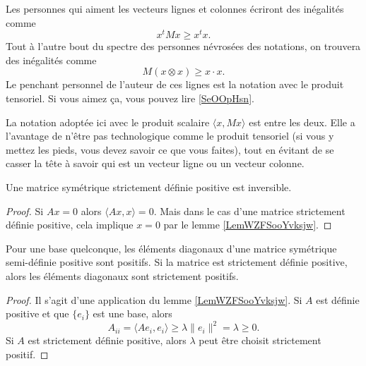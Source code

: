 Les personnes qui aiment les vecteurs lignes et colonnes écriront des inégalités comme
\begin{equation}
    x^tMx\geq x^tx.
\end{equation}
Tout à l'autre bout du spectre des personnes névrosées des notations, on trouvera des inégalités comme
\begin{equation}
    M(x\otimes x)\geq x\cdot x.
\end{equation}
Le penchant personnel de l'auteur de ces lignes est la notation avec le produit tensoriel. Si vous aimez ça, vous pouvez lire \ref{SeOOpHsn}.

La notation adoptée ici avec le produit scalaire \( \langle x, Mx\rangle \) est entre les deux. Elle a l'avantage de n'être pas technologique comme le produit tensoriel (si vous y mettez les pieds, vous devez savoir ce que vous faites), tout en évitant de se casser la tête à savoir qui est un vecteur ligne ou un vecteur colonne.

\begin{corollary}
    Une matrice symétrique strictement définie positive est inversible.
\end{corollary}

\begin{proof}
    Si \( Ax=0\) alors \( \langle Ax, x\rangle =0\). Mais dans le cas d'une matrice strictement définie positive, cela implique \( x=0\) par le lemme \ref{LemWZFSooYvksjw}.
\end{proof}

\begin{lemma}
    Pour une base quelconque, les éléments diagonaux d'une matrice symétrique semi-définie positive sont positifs. Si la matrice est strictement définie positive, alors les éléments diagonaux sont strictement positifs.
\end{lemma}

\begin{proof}
    Il s'agit d'une application du lemme \ref{LemWZFSooYvksjw}. Si \( A\) est définie positive et que \( \{ e_i \}\) est une base, alors
    \begin{equation}
        A_{ii}=\langle Ae_i, e_i\rangle \geq \lambda\| e_i \|^2=\lambda\geq 0.
    \end{equation}
    Si \( A\) est strictement définie positive, alors \( \lambda\) peut être choisit strictement positif.
\end{proof}
 
